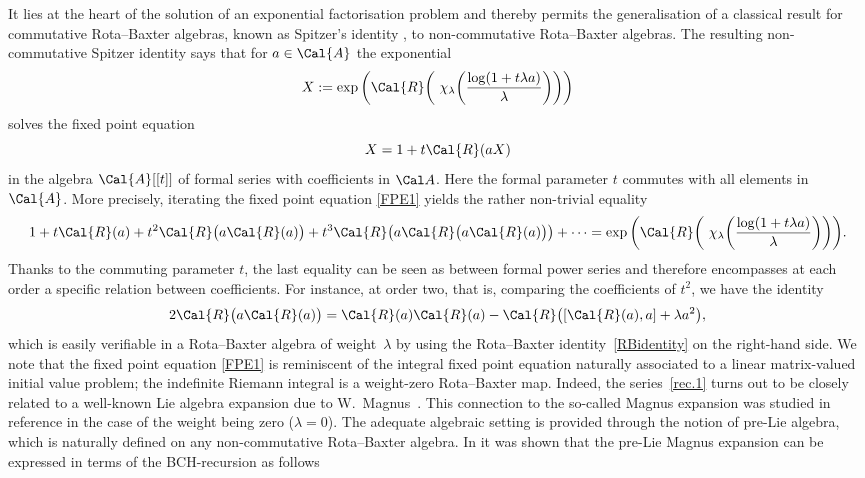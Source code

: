 \documentclass[pdftex]{sigma}
\numberwithin{equation}{section}
\begin{document}
It lies at the heart of the solution of an exponential factorisation problem \cite{KLM06} and thereby permits the generalisation of a classical result for commutative Rota--Baxter algebras, known as Spitzer's identity \cite{Sp56}, to non-commutative Rota--Baxter algebras. The resulting non-com\-mu\-ta\-tive Spitzer identity says that for $a \in \Cal{A}$ the exponential
\begin{displaymath}
X:=\exp\bigg( \Cal{R}\bigg(\ \chi_{\lambda}\bigg( \frac{\log(1+t\lambda a)}{\lambda}\bigg)\bigg) \bigg)
\end{displaymath}
solves the fixed point equation
\begin{equation}
\label{FPE1}
X = 1 + t\Cal{R}(aX)
\end{equation}
 in the algebra $\Cal{A}[[t]]$ of formal series with coefficients in $\Cal A$. Here the formal parameter $t$ commutes with all elements in $\Cal{A}$.
More precisely, iterating the fixed point equation \eqref{FPE1} yields the rather non-trivial equality
\begin{displaymath}
1+ t\Cal{R}(a) + t^2\Cal{R}\big(a\Cal{R}(a)\big) + t^3\Cal{R}\big(a\Cal{R}\big(a\Cal{R}(a)\big)\big) + \cdots
= \exp\bigg( \Cal{R}\bigg(\ \chi_{\lambda}\bigg( \frac{\log(1+ t\lambda a)}{\lambda}\bigg)\bigg) \bigg).
\end{displaymath}
Thanks to the commuting parameter $t$, the last equality can be seen as between formal power series and therefore encompasses at each order a specific relation between coefficients. For instance, at order two, that is, comparing the coefficients of $t^2$, we have the identity
\begin{displaymath}
2 \Cal{R}\big(a\Cal{R}(a)\big) = \Cal{R}(a)\Cal{R}(a) - \Cal{R}\big([\Cal{R}(a),a] + \lambda a^2\big),
\end{displaymath}
which is easily verifiable in a Rota--Baxter algebra of weight~$\lambda$ by using the Rota--Baxter identity~\eqref{RBidentity} on the right-hand side. We note that the fixed point equation \eqref{FPE1} is reminiscent of the integral fixed point equation naturally associated to a linear matrix-valued initial value problem; the indefinite Riemann integral is a weight-zero Rota--Baxter map. Indeed, the series~\eqref{rec.1} turns out to be closely related to a well-known Lie algebra expansion due to W.~Mag\-nus~\cite{WM54}. This connection to the so-called Magnus expansion was studied in reference \cite{KLM06} in the case of the weight being zero ($\lambda=0$). The adequate algebraic setting is provided through the notion of pre-Lie algebra, which is naturally defined on any non-commutative Rota--Baxter algebra. In \cite{KM08} it was shown that the pre-Lie Magnus expansion can be expressed in terms of the BCH-recursion as follows
\end{document}
